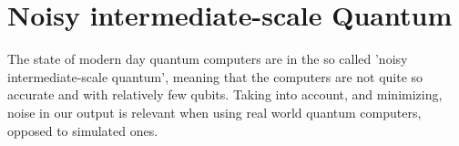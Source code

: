 \section{Noisy intermediate-scale Quantum}

The state of modern day quantum computers are in the so called 'noisy intermediate-scale quantum', meaning that the computers are not quite so accurate and with relatively few qubits. Taking into account, and minimizing, noise in our output is relevant when using real world quantum computers, opposed to simulated ones. 


